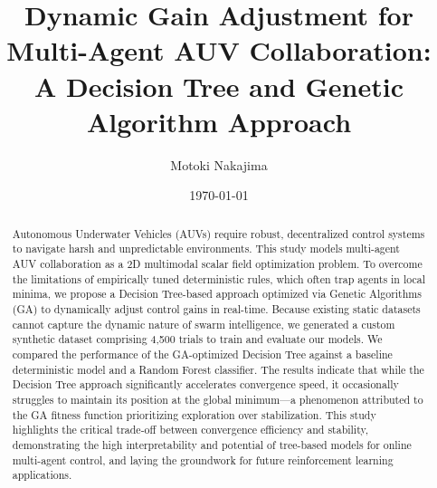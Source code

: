 \documentclass[11pt]{article}
\title{Dynamic Gain Adjustment for Multi-Agent AUV Collaboration: A Decision Tree and Genetic Algorithm Approach}
\author{Motoki Nakajima}
\date{\today}
\begin{document}
\maketitle

\begin{abstract}
Autonomous Underwater Vehicles (AUVs) require robust, decentralized control systems to navigate harsh and unpredictable environments.
This study models multi-agent AUV collaboration as a 2D multimodal scalar field optimization problem.
To overcome the limitations of empirically tuned deterministic rules, which often trap agents in local minima, we propose a Decision Tree-based approach optimized via Genetic Algorithms (GA) to dynamically adjust control gains in real-time.
Because existing static datasets cannot capture the dynamic nature of swarm intelligence, we generated a custom synthetic dataset comprising 4,500 trials to train and evaluate our models.
We compared the performance of the GA-optimized Decision Tree against a baseline deterministic model and a Random Forest classifier.
The results indicate that while the Decision Tree approach significantly accelerates convergence speed, it occasionally struggles to maintain its position at the global minimum—a phenomenon attributed to the GA fitness function prioritizing exploration over stabilization.
This study highlights the critical trade-off between convergence efficiency and stability, demonstrating the high interpretability and potential of tree-based models for online multi-agent control, and laying the groundwork for future reinforcement learning applications.
\end{abstract}
\end{document}
